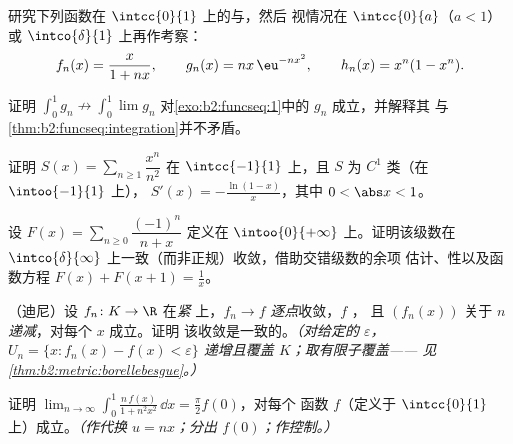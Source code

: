 \begin{exercise}[$\star$]\label{exo:b2:funcseq:1}
研究下列函数在 $\intcc{0}{1}$ 上的与，然后
视情况在 $\intcc{0}{a}$（$a < 1$）或 $\intco{\delta}{1}$ 上再作考察：
\[
f_n(x) = \frac{x}{1 + nx},
\qquad
g_n(x) = n x\,\eu^{-n x^2},
\qquad
h_n(x) = x^n(1 - x^n).
\]
\end{exercise}

\begin{exercise}[$\star$]\label{exo:b2:funcseq:2}
证明 $\displaystyle\int_0^1 g_n \not\to \int_0^1 \lim g_n$
对\cref{exo:b2:funcseq:1}中的 $g_n$ 成立，并解释其
与\cref{thm:b2:funcseq:integration}并不矛盾。
\end{exercise}

\begin{exercise}[$\star$]\label{exo:b2:funcseq:3}
证明 $S(x) = \sum_{n\geq1} \dfrac{x^n}{n^2}$ 在
$\intcc{-1}{1}$ 上，且 $S$ 为 $C^1$ 类（在 $\intoo{-1}{1}$ 上），
$S'(x) = -\frac{\ln(1-x)}{x}$，其中 $0 < \abs x < 1$。
\end{exercise}

\begin{exercise}[$\star\star$]\label{exo:b2:funcseq:4}
设 $F(x) = \sum_{n \geq 0} \dfrac{(-1)^n}{n + x}$ 定义在
$\intoo{0}{+\infty}$ 上。证明该级数在
$\intco{\delta}{\infty}$ 上一致（而非正规）收敛，借助交错级数的余项
估计、性以及函数方程 $F(x) + F(x + 1) =
\frac1x$。
\end{exercise}

\begin{exercise}[$\star\star$]\label{exo:b2:funcseq:5}
（迪尼）设 $f_n \colon K \to \R$ 在\emph{紧}
上，$f_n \to f$ \emph{逐点}收敛，$f$ ，
且 $(f_n(x))$ 关于 $n$ \emph{递减}，对每个 $x$ 成立。证明
该收敛是一致的。\emph{（对给定的 $\varepsilon$，
$U_n = \{x : f_n(x) - f(x) < \varepsilon\}$ 递增且覆盖
$K$；取有限子覆盖——
见\cref{thm:b2:metric:borellebesgue}。）}
\end{exercise}

\begin{exercise}[$\star\star$]\label{exo:b2:funcseq:6}
证明 $\displaystyle\lim_{n\to\infty} \int_0^1
\frac{n\,f(x)}{1 + n^2x^2}\,\dd x = \frac{\pi}{2} f(0)$，对每个
函数 $f$（定义于 $\intcc{0}{1}$ 上）成立。\emph{（作代换 $u = nx$；分出
$f(0)$；作控制。）}
\end{exercise}

